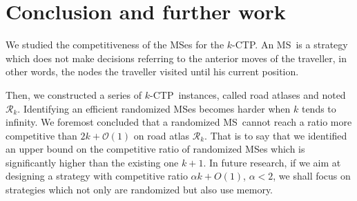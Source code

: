 \documentclass[preprint]{elsarticle}
\newcommand{\kctp}{$k$-CTP}
\newcommand{\mcalr}{\mathcal{R}}
\newcommand{\mts}{MS}
\begin{document}
\section{Conclusion and further work} \label{sec:conclusion}

We studied the competitiveness of the \mts es for the \kctp. An \mts ~is a strategy which does not make decisions referring to the anterior moves of the traveller, in other words, the nodes the traveller visited until his current position.

Then, we constructed a series of \kctp ~instances, called road atlases and noted $\mcalr_k$. Identifying an efficient randomized \mts{}es becomes harder when $k$ tends to infinity. We foremost concluded that a randomized  \mts ~cannot reach a ratio more competitive than $2k+\mathcal{O}\left(1\right)$ on road atlas $\mcalr_k$. That is to say that we identified an upper bound on the competitive ratio of randomized \mts{}es which is significantly higher than the existing one $k+1$. In future research, if we aim at designing a strategy with competitive ratio $\alpha k + O\left(1\right)$, $\alpha < 2$, we shall focus on strategies which not only are randomized but also use memory.



\end{document}
